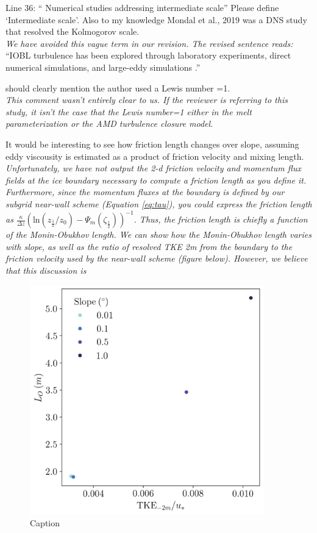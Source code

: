 \documentclass[tc, manuscript]{copernicus}
\begin{document}
Line 36: “ Numerical studies addressing intermediate scale”
Please define ‘Intermediate scale’. Also to my knowledge Mondal et al., 2019 was a DNS study that resolved the Kolmogorov scale.\\
\textit{We have avoided this vague term in our revision. The revised sentence reads:}\\
``IOBL turbulence has been explored through laboratory experiments, direct numerical simulations, and large-eddy simulations \citep{middleton_numerical_2021, mondal_ablation_2019, vreugdenhil_stratification_2019, mcconnochie_dissolution_2018}.''

should clearly mention the author used a Lewis number =1.\\
\textit{This comment wasn't entirely clear to us. If the reviewer is referring to this study, it isn't the case that the Lewis number=1 either in the melt parameterization or the AMD turbulence closure model.}

It would be interesting to see how friction length changes over slope, assuming eddy viscousity is estimated as a product of friction velocity and mixing length.\\
\textit{Unfortunately, we have not output the 2-d friction velocity and momentum flux fields at the ice boundary necessary to compute a friction length as you define it. Furthermore, since the momentum fluxes at the boundary is defined by our subgrid near-wall scheme (Equation \ref{eq:tau}), you could express the friction length as 
$\frac{\kappa}{\Delta z}(\textrm{ln}\left(z_{\frac{1}{2}}/z_0\right)-\Psi_m\left(\zeta_{\frac{1}{2}}\right))^{-1}$. Thus, the friction length is chiefly a function of the Monin-Obukhov length. We can show how the Monin-Obukhov length varies with slope, as well as the ratio of resolved TKE 2m from the boundary to the friction velocity used by the near-wall scheme (figure below). However, we believe that this discussion is }
\begin{figure}
    \centering
    \includegraphics[width=4in]{Figures/ol_eres_dslope_t43h_tav13h_fit.png}
    \caption{Caption}
    \label{fig:R1}
\end{figure}
\end{document}

